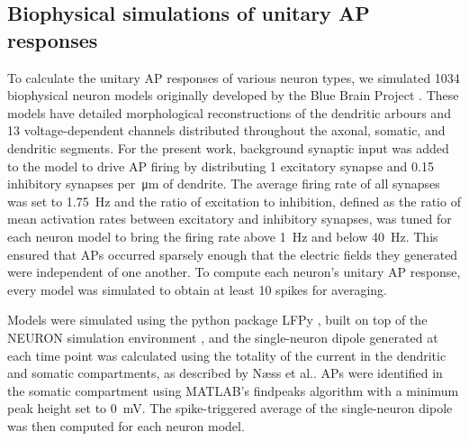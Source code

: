 \subsection{Biophysical simulations of unitary AP responses}
To calculate the unitary AP responses of various neuron types, we simulated 1034 biophysical neuron models originally developed by the Blue Brain Project \cite{Markram2015}. These models have detailed morphological reconstructions of the dendritic arbours and 13 voltage-dependent channels distributed throughout the axonal, somatic, and dendritic segments. For the present work, background synaptic input was added to the model to drive AP firing by distributing 1 excitatory synapse and 0.15 inhibitory synapses per~\unit{\micro\meter} of dendrite. The average firing rate of all synapses was set to 1.75~\unit{\hertz} and the ratio of excitation to inhibition, defined as the ratio of mean activation rates between excitatory and inhibitory synapses, was tuned for each neuron model to bring the firing rate above \qty{1}{\hertz} and below 40~\unit{\hertz}. This ensured that APs occurred sparsely enough that the electric fields they generated were independent of one another. To compute each neuron's unitary AP response, every model was simulated to obtain at least 10 spikes for averaging.

Models were simulated using the python package LFPy \cite{Hagen2018}, built on top of the NEURON simulation environment \cite{Carnevale2006}, and the single-neuron dipole generated at each time point was calculated using the totality of the current in the dendritic and somatic compartments, as described by Næss et al.\cite{Næss2021}. APs were identified in the somatic compartment using MATLAB's findpeaks algorithm with a minimum peak height set to 0~\unit{\milli\volt}. The spike-triggered average of the single-neuron dipole was then computed for each neuron model. 

